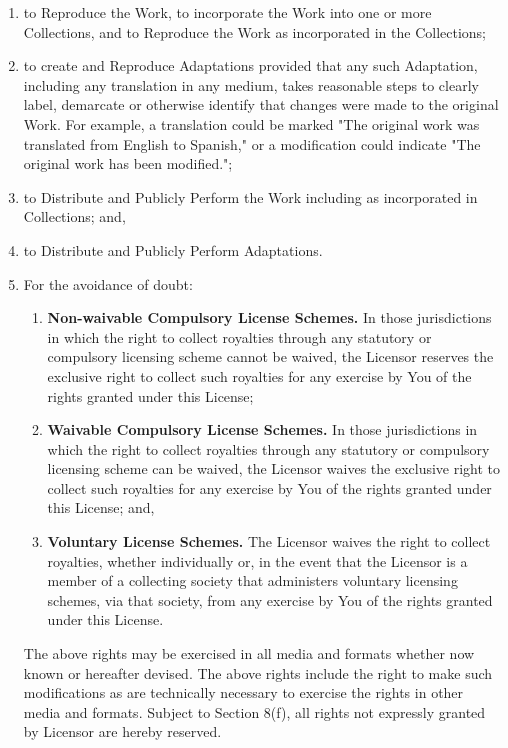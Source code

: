     \begin{enumerate}[noitemsep,label=\alph*.]
      
      \item to Reproduce the Work, to incorporate the Work into one or more Collections, and to Reproduce the Work as incorporated in the Collections;
      
      \item to create and Reproduce Adaptations provided that any such Adaptation, including any translation in any medium, takes reasonable steps to clearly label, demarcate or otherwise identify that changes were made to the original Work. For example, a translation could be marked "The original work was translated from English to Spanish," or a modification could indicate "The original work has been modified.";
      
      \item to Distribute and Publicly Perform the Work including as incorporated in Collections; and,
      
      \item to Distribute and Publicly Perform Adaptations.
      
      \item For the avoidance of doubt:
        \begin{enumerate}[noitemsep,label=\roman*.]
          
          \item \textbf{Non-waivable Compulsory License Schemes.} In those jurisdictions in which the right to collect royalties through any statutory or compulsory licensing scheme cannot be waived, the Licensor reserves the exclusive right to collect such royalties for any exercise by You of the rights granted under this License;
          
          \item \textbf{Waivable Compulsory License Schemes.} In those jurisdictions in which the right to collect royalties through any statutory or compulsory licensing scheme can be waived, the Licensor waives the exclusive right to collect such royalties for any exercise by You of the rights granted under this License; and,
          
          \item \textbf{Voluntary License Schemes.} The Licensor waives the right to collect royalties, whether individually or, in the event that the Licensor is a member of a collecting society that administers voluntary licensing schemes, via that society, from any exercise by You of the rights granted under this License.

        \end{enumerate}
      
      The above rights may be exercised in all media and formats whether now known or hereafter devised. The above rights include the right to make such modifications as are technically necessary to exercise the rights in other media and formats. Subject to Section 8(f), all rights not expressly granted by Licensor are hereby reserved.
    
    \end{enumerate}
    
